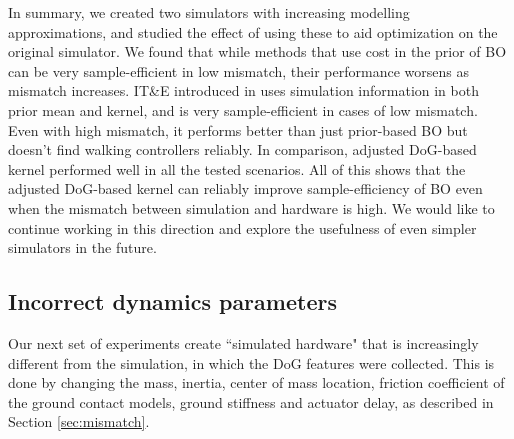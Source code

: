 In summary, we created two simulators with increasing modelling approximations, and studied the effect of using these to aid optimization on the original simulator. We found that while methods that use cost in the prior of BO can be very sample-efficient in low mismatch, their performance worsens as mismatch increases. \mbox{IT\&E} introduced in \cite{cully2015robots} uses simulation information in both prior mean and kernel, and is very sample-efficient in cases of low mismatch. Even with high mismatch, it performs better than just prior-based BO but doesn't find walking controllers reliably. In comparison, adjusted DoG-based kernel performed well in all the tested scenarios. All of this shows that the adjusted DoG-based kernel can reliably improve sample-efficiency of BO even when the mismatch between simulation and hardware is high. We would like to continue working in this direction and explore the usefulness of even simpler simulators in the future.


\subsection{Incorrect dynamics parameters}

Our next set of experiments create ``simulated hardware" that is increasingly different from the simulation, in which the DoG features were collected. This is done by changing the mass, inertia, center of mass location, friction coefficient of the ground contact models, ground stiffness and actuator delay, as described in Section \ref{sec:mismatch}.

